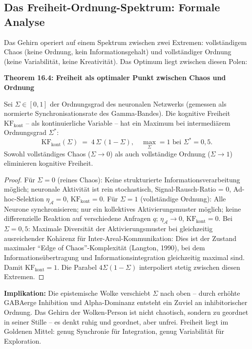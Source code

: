 ﻿\documentclass[12pt,a4paper]{report}
\theoremstyle{plain}
\theoremstyle{definition}
\theoremstyle{remark}
\begin{document}
	\subsection{Das Freiheit-Ordnung-Spektrum: Formale Analyse}

	Das Gehirn operiert auf einem Spektrum zwischen zwei Extremen:
	vollständigem Chaos (keine Ordnung, kein Informationsgehalt)
	und vollständiger Ordnung (keine Variabilität, keine Kreativität).
	Das Optimum liegt zwischen diesen Polen:

	
	\noindent\textbf{Theorem 16.4: Freiheit als optimaler Punkt zwischen Chaos und Ordnung}

		Sei $\Sigma \in [0,1]$ der Ordnungsgrad des neuronalen Netzwerks
		(gemessen als normierte Synchronisationsrate des Gamma-Bandes).
		Die kognitive Freiheit $\mathrm{KF}_{\mathrm{kont}}$ -- als
		kontinuierliche Variable -- hat ein Maximum bei intermediärem
		Ordnungsgrad $\Sigma^*$:
		\[
		\mathrm{KF}_{\mathrm{kont}}(\Sigma)
		\;=\; 4\,\Sigma\,(1-\Sigma),
		\quad
		\max_\Sigma = 1 \text{ bei } \Sigma^* = 0{,}5.
		\]
		Sowohl vollständiges Chaos ($\Sigma \to 0$) als auch
		vollständige Ordnung ($\Sigma \to 1$) eliminieren kognitive Freiheit.


	\begin{proof}
		Für $\Sigma = 0$ (reines Chaos): Keine strukturierte Informationsverarbeitung
		möglich; neuronale Aktivität ist rein stochastisch, Signal-Rausch-Ratio = 0,
		Ad-hoc-Selektion $\eta_\mathcal{A} = 0$, $\mathrm{KF}_{\mathrm{kont}} = 0$.
		Für $\Sigma = 1$ (vollständige Ordnung): Alle Neurone synchronisieren;
		nur ein kollektives Aktivierungsmuster möglich; keine differenzielle
		Reaktion auf verschiedene Anfragen $q$; $\eta_\mathcal{A} \to 0$,
		$\mathrm{KF}_{\mathrm{kont}} = 0$.
		Bei $\Sigma = 0{,}5$: Maximale Diversität der Aktivierungsmuster bei
		gleichzeitig ausreichender Kohärenz für Inter-Areal-Kommunikation:
		Dies ist der Zustand maximaler ``Edge of Chaos''-Komplexität
		(Langton, 1990), bei dem Informationsübertragung und Informationsintegration
		gleichzeitig maximal sind. Damit $\mathrm{KF}_{\mathrm{kont}} = 1$.
		Die Parabel $4\Sigma(1-\Sigma)$ interpoliert stetig zwischen diesen Extremen. \hfill
	\end{proof}

	\textbf{Implikation:}
	Die epistemische Wolke verschiebt $\Sigma$ nach oben -- durch
	erhöhte GABAerge Inhibition und Alpha-Dominanz entsteht ein
	Zuviel an inhibitorischer Ordnung. Das Gehirn der Wolken-Person
	ist nicht chaotisch, sondern zu geordnet in seiner Stille --
	es denkt ruhig und geordnet, aber unfrei.
	Freiheit liegt im Goldenen Mittel: genug Synchronie für Integration,
	genug Variabilität für Exploration.
\end{document}
